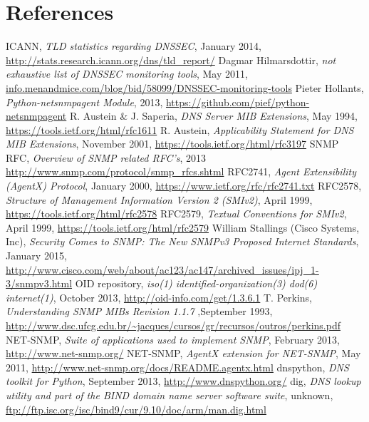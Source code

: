 \section*{References}
\label{chap:references}
\begin{thebibliography}{99}
 ICANN, {\em TLD statistics regarding DNSSEC}, January 2014, \url{http://stats.research.icann.org/dns/tld_report/}
 Dagmar Hilmarsdottir, {\em not exhaustive list of DNSSEC monitoring tools}, May 2011, \url{info.menandmice.com/blog/bid/58099/DNSSEC-monitoring-tools}
 Pieter Hollants, {\em Python-netsnmpagent Module}, 2013, \url{https://github.com/pief/python-netsnmpagent}
 R. Austein \& J. Saperia, {\em DNS Server MIB Extensions}, May 1994, \url{https://tools.ietf.org/html/rfc1611}
 R. Austein, {\em Applicability Statement for DNS MIB Extensions}, November 2001, \url{https://tools.ietf.org/html/rfc3197}
 SNMP RFC, {\em Overview of SNMP related RFC's}, 2013 \url{http://www.snmp.com/protocol/snmp_rfcs.shtml} 
 RFC2741,  {\em Agent Extensibility (AgentX) Protocol}, January 2000, \url{https://www.ietf.org/rfc/rfc2741.txt}
 RFC2578, {\em Structure of Management Information Version 2 (SMIv2)}, April 1999, \url{https://tools.ietf.org/html/rfc2578}
 RFC2579, {\em Textual Conventions for SMIv2}, April 1999, \url{https://tools.ietf.org/html/rfc2579}
 William Stallings (Cisco Systems, Inc), {\em Security Comes to SNMP: The New SNMPv3 Proposed Internet Standards}, January  2015, \url{http://www.cisco.com/web/about/ac123/ac147/archived_issues/ipj_1-3/snmpv3.html}
 OID repository, {\em iso(1) identified-organization(3) dod(6) internet(1)}, October 2013, \url{http://oid-info.com/get/1.3.6.1}
 T. Perkins, {\em Understanding SNMP MIBs Revision 1.1.7 },September 1993, \url{http://www.dsc.ufcg.edu.br/~jacques/cursos/gr/recursos/outros/perkins.pdf}
 NET-SNMP, {\em Suite of applications used to implement SNMP}, February 2013, \url{http://www.net-snmp.org/}
 NET-SNMP, {\em AgentX extension for NET-SNMP}, May 2011, \url{http://www.net-snmp.org/docs/README.agentx.html}
 dnspython, {\em DNS toolkit for Python}, September 2013, \url{http://www.dnspython.org/}
 dig, {\em DNS lookup utility and part of the BIND domain name server software suite}, unknown, \url{ftp://ftp.isc.org/isc/bind9/cur/9.10/doc/arm/man.dig.html}

\end{thebibliography}
